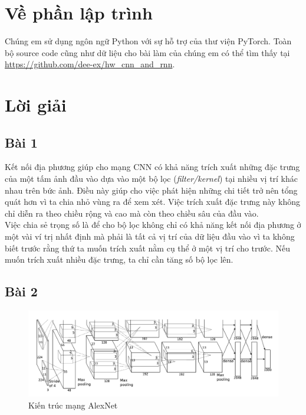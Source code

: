 \documentclass[a4paper]{article}
\begin{document}
\section{Về phần lập trình}
Chúng em sử dụng ngôn ngữ Python với sự hỗ trợ của thư viện PyTorch. Toàn bộ source code cũng như dữ liệu cho bài làm của chúng em có thể tìm thấy tại \href{https://github.com/dee-ex/hw\_cnn\_and\_rnn}{https://github.com/dee-ex/hw\_cnn\_and\_rnn}.
\newpage

\section{Lời giải}

\subsection{Bài 1}
Kết nối địa phương giúp cho mạng CNN có khả năng trích xuất những đặc trưng của một tấm ảnh đầu vào dựa vào một bộ lọc (\textit{filter/kernel}) tại nhiều vị trí khác nhau trên bức ảnh. Điều này giúp cho việc phát hiện những chi tiết trở nên tổng quát hơn vì ta chia nhỏ vùng ra để xem xét. Việc trích xuất đặc trưng này không chỉ diễn ra theo chiều rộng và cao mà còn theo chiều sâu của đầu vào.\\
Việc chia sẻ trọng số là để cho bộ lọc không chỉ có khả năng kết nối địa phương ở một vài ví trị nhất định mà phải là tất cả vị trí của dữ liệu đầu vào vì ta không biết trước rằng thứ ta muốn trích xuất nằm cụ thể ở một vị trí cho trước. Nếu muốn trích xuất nhiều đặc trưng, ta chỉ cần tăng số bộ lọc lên.

\subsection{Bài 2}
\begin{figure}[h!]
\centering
\includegraphics[width=17cm]{images/alexnet.png}
\caption*{Kiến trúc mạng AlexNet}
\end{figure}
\end{document}
